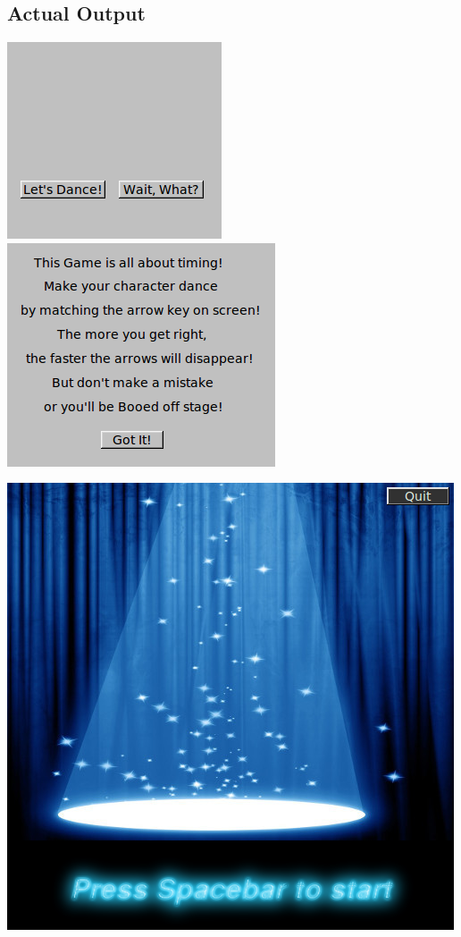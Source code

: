 \documentclass {article}
\begin{document}
\subsection*{Actual Output}

\includegraphics[scale=0.5]{dance01.png}
\includegraphics[scale=0.5]{dance02.png}

\clearpage

\includegraphics[scale=0.5]{dance03.png}
\end{document}
